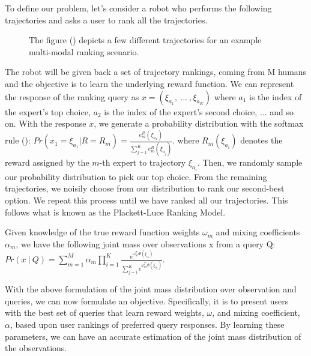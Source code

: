 \documentclass[
  letterpaper,
  numbers=noenddot,
  DIV=11,
  oneside]{scrreprt}
\theoremstyle{remark}
\begin{document}
To define our problem, let's consider a robot who performs the following
trajectories and asks a user to rank all the trajectories.

\begin{figure}


\caption{\label{fig-robot-traj}The figure
() depicts a few
different trajectories for an example multi-modal ranking scenario.}

\end{figure}%

The robot will be given back a set of trajectory rankings, coming from M
humans and the objective is to learn the underlying reward function. We
can represent the response of the ranking query as
\(x = (\xi_{a_1},\ ...\ ,\xi_{a_K})\) where \(a_1\) is the index of the
expert's top choice, \(a_2\) is the index of the expert's second choice,
... and so on. With the response \(x\), we generate a probability
distribution with the softmax rule
():
\(Pr(x_1 = \xi_{a_1} | R = R_m) = \frac{e^R_m(\xi_{a_1})}{\sum_{j=1}^Ke^R_m(\xi_{a_j})}\).
where \(R_m(\xi_{a_i})\) denotes the reward assigned by the \(m\)-th
expert to trajectory \(\xi_{a_i}\). Then, we randomly sample our
probability distribution to pick our top choice. From the remaining
trajectories, we noisily choose from our distribution to rank our
second-best option. We repeat this process until we have ranked all our
trajectories. This follows what is known as the Plackett-Luce Ranking
Model.

Given knowledge of the true reward function weights \(\omega_m\) and
mixing coefficients \(\alpha_m\), we have the following joint mass over
observations x from a query Q:
\(Pr(x\ |\ Q) = \sum_{m = 1}^M \alpha_m\prod_{i = 1}^K\frac{e^{\omega_m^T \Phi(\xi_{a_i})}}{\sum_{j = i}^K e^{\omega_m^T \Phi(\xi_{a_j})}}\).

With the above formulation of the joint mass distribution over
observation and queries, we can now formulate an objective.
Specifically, it is to present users with the best set of queries that
learn reward weights, \(\omega\), and mixing coefficient, \(\alpha\),
based upon user rankings of preferred query responses. By learning these
parameters, we can have an accurate estimation of the joint mass
distribution of the observations.
\end{document}
